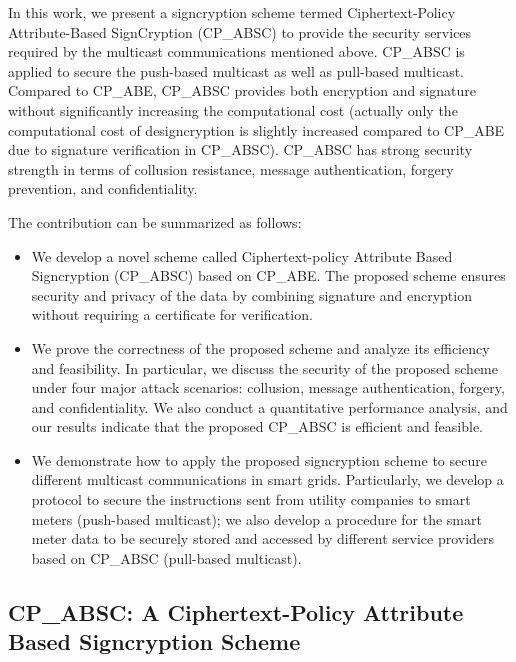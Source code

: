 \documentclass[letterpaper,12pt]{article}
\begin{document}
%
In this work, we present a signcryption scheme termed Ciphertext-Policy Attribute-Based SignCryption (CP\_ABSC) to provide the security services required by the multicast communications mentioned above. CP\_ABSC is applied to secure the push-based multicast as well as pull-based multicast. Compared to CP\_ABE, CP\_ABSC provides both encryption and signature without significantly increasing the computational cost (actually only the computational cost of designcryption is slightly increased compared to CP\_ABE due to signature verification in CP\_ABSC). CP\_ABSC has strong security strength in terms of collusion resistance, message authentication, forgery prevention, and confidentiality.

The contribution can be summarized as follows:
\begin{itemize}
\item We develop a novel scheme called Ciphertext-policy Attribute Based Signcryption (CP\_ABSC) based on CP\_ABE. The proposed scheme ensures security and privacy of the data by combining  signature and encryption without requiring a certificate for verification.
\item We prove the correctness of the proposed scheme and analyze its efficiency and feasibility. In particular,  we discuss  the security of the proposed scheme under four major attack scenarios: collusion, message authentication, forgery, and confidentiality. We also conduct a quantitative performance analysis, and our results indicate that the proposed CP\_ABSC is efficient and feasible.
\item We demonstrate how to apply the proposed signcryption scheme to secure different multicast communications in smart grids. Particularly, we develop a protocol to secure the instructions sent from utility companies to smart meters (push-based multicast); we also develop a procedure for the smart meter data to be securely stored and accessed by different  service providers based on CP\_ABSC (pull-based multicast). %
\end{itemize}


\subsection{CP\_ABSC: A Ciphertext-Policy Attribute Based Signcryption Scheme}\label{sec:CP-ABSC}
%
%
\end{document}
